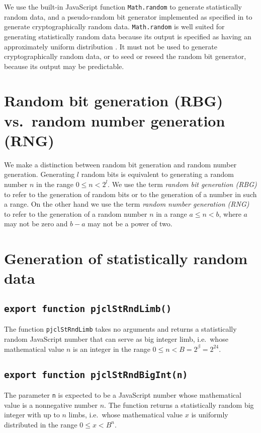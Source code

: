 \documentclass[12pt]{article}
\begin{document}
We use the built-in JavaScript function {\tt Math.random} to generate
statistically random data, and a pseudo-random bit generator
implemented as specified in \cite[\S~10.1.1]{SP800-90Ar1} to generate
cryptographically random data.  {\tt Math.random} is well suited for generating statistically random data because its output is specified as having an approximately uniform distribution
\cite[15.8.2.14]{ecmascript51}.  It must not be used to
generate cryptographically random data, or to seed or reseed the random
bit generator, because its output may be predictable. 

\section{Random bit generation (RBG) vs.\ random number generation (RNG)}

We make a distinction between random bit generation and random number
generation.  Generating $l$ random bits is equivalent to generating a
random number $n$ in the range $0 \leq n < 2^l$.  We use the term {\em random bit
generation (RBG)\/} to refer to the generation of random bits or to the
generation of a number in such a range.  On the other hand we use the
term {\em random number generation (RNG)} to refer to the generation
of a random number $n$ in a range $a \leq n < b$, where $a$ may not be
zero and $b-a$ may not be a power of two.

\section{Generation of statistically random data}

\subsection{\tt export function pjclStRndLimb()}

The function {\tt pjclStRndLimb} takes no arguments and returns a
statistically random JavaScript number that can serve as big integer
limb, i.e.\ whose mathematical value $n$ is an integer in the range $0
\leq n < B = 2^\beta = 2^{24}$.

\subsection{\tt export function pjclStRndBigInt(n)}

The parameter {\tt n} is expected to be a JavaScript number whose
mathematical value is a nonnegative number $n$.  The function returns
a statistically random big integer with up to $n$ limbs, i.e.\ whose
mathematical value $x$ is uniformly distributed in the range $0 \leq x
< B^n$.
\end{document}

